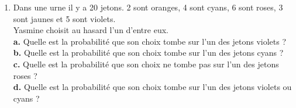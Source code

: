{\begin{Exercice}
\begin{enumerate}[itemsep=1em]
	\item \begin{minipage}[t]{\linewidth}Dans une urne il y a 20 jetons. 2 sont oranges, 4 sont cyans, 6 sont roses, 3 sont jaunes et 5 sont violets.\\ Yasmine choisit au hasard l'un d'entre eux.\\ \textbf {a.}  Quelle est la probabilité que son choix tombe sur l'un des jetons violets ?\\\textbf {b.}  Quelle est la probabilité que son choix tombe sur l'un des jetons cyans ?\\\textbf {c.}  Quelle est la probabilité que son choix ne tombe pas sur l'un des jetons roses ?\\\textbf {d.}  Quelle est la probabilité que son choix tombe sur l'un des jetons violets ou cyans ?\\\end{minipage}
\end{enumerate}
\end{Exercice}

}
